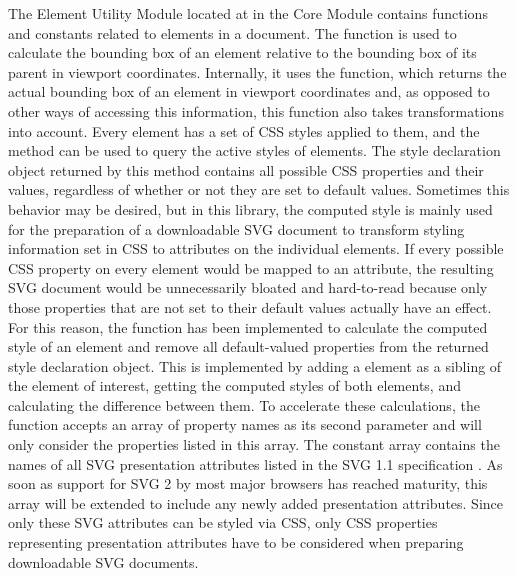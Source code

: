 The Element Utility Module located at  in the Core Module contains functions and constants related to elements in a document.
The  function is used to calculate the bounding box of an element relative to the bounding box of its parent in viewport coordinates.
Internally, it uses the  function, which returns the actual bounding box of an element in viewport coordinates and, as opposed to other ways of accessing this information, this function also takes transformations into account.
Every element has a set of CSS styles applied to them, and the  method can be used to query the active styles of elements.
The style declaration object returned by this method contains all possible CSS properties and their values, regardless of whether or not they are set to default values.
Sometimes this behavior may be desired, but in this library, the computed style is mainly used for the preparation of a downloadable SVG document to transform styling information set in CSS to attributes on the individual elements.
If every possible CSS property on every element would be mapped to an attribute, the resulting SVG document would be unnecessarily bloated and hard-to-read because only those properties that are not set to their default values actually have an effect.
For this reason, the  function has been implemented to calculate the computed style of an element and remove all default-valued properties from the returned style declaration object.
This is implemented by adding a  element as a sibling of the element of interest, getting the computed styles of both elements, and calculating the difference between them.
To accelerate these calculations, the  function accepts an array of property names as its second parameter and will only consider the properties listed in this array.
The constant  array contains the names of all SVG presentation attributes listed in the SVG 1.1 specification \parencite{SVG11}.
As soon as support for SVG 2 \parencite{SVG2} by most major browsers has reached maturity, this array will be extended to include any newly added presentation attributes. 
Since only these SVG attributes can be styled via CSS, only CSS properties representing presentation attributes have to be considered when preparing downloadable SVG documents.

